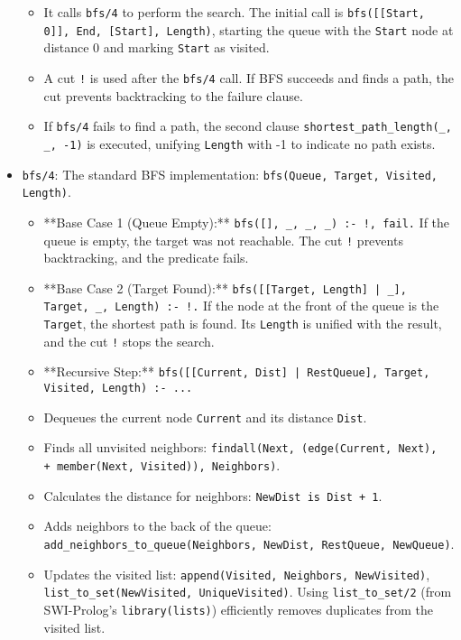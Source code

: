 \documentclass[12pt,a4paper]{article}
\begin{document}
\begin{itemize}
        \begin{itemize}
            \item It calls \texttt{bfs/4} to perform the search. The initial call is \texttt{bfs([[Start, 0]], End, [Start], Length)}, starting the queue with the \texttt{Start} node at distance 0 and marking \texttt{Start} as visited.
            \item A cut \texttt{!} is used after the \texttt{bfs/4} call. If BFS succeeds and finds a path, the cut prevents backtracking to the failure clause.
            \item If \texttt{bfs/4} fails to find a path, the second clause \texttt{shortest\_path\_length(\_, \_, -1)} is executed, unifying \texttt{Length} with -1 to indicate no path exists.
        \end{itemize}
    \item \texttt{bfs/4}: The standard BFS implementation: \texttt{bfs(Queue, Target, Visited, Length)}.
        \begin{itemize}
            \item **Base Case 1 (Queue Empty):** \texttt{bfs([], \_, \_, \_) :- !, fail.} If the queue is empty, the target was not reachable. The cut \texttt{!} prevents backtracking, and the predicate fails.
            \item **Base Case 2 (Target Found):** \texttt{bfs([[Target, Length] | \_], Target, \_, Length) :- !.} If the node at the front of the queue is the \texttt{Target}, the shortest path is found. Its \texttt{Length} is unified with the result, and the cut \texttt{!} stops the search.
            \item **Recursive Step:** \texttt{bfs([[Current, Dist] | RestQueue], Target, Visited, Length) :- ...}
                \item Dequeues the current node \texttt{Current} and its distance \texttt{Dist}.
                \item Finds all unvisited neighbors: \texttt{findall(Next, (edge(Current, Next), \\+ member(Next, Visited)), Neighbors)}.
                \item Calculates the distance for neighbors: \texttt{NewDist is Dist + 1}.
                \item Adds neighbors to the back of the queue: \texttt{add\_neighbors\_to\_queue(Neighbors, NewDist, RestQueue, NewQueue)}.
                \item Updates the visited list: \texttt{append(Visited, Neighbors, NewVisited)}, \texttt{list\_to\_set(NewVisited, UniqueVisited)}. Using \texttt{list\_to\_set/2} (from SWI-Prolog's \texttt{library(lists)}) efficiently removes duplicates from the visited list.

\end{itemize}
\end{itemize}
\end{document}
